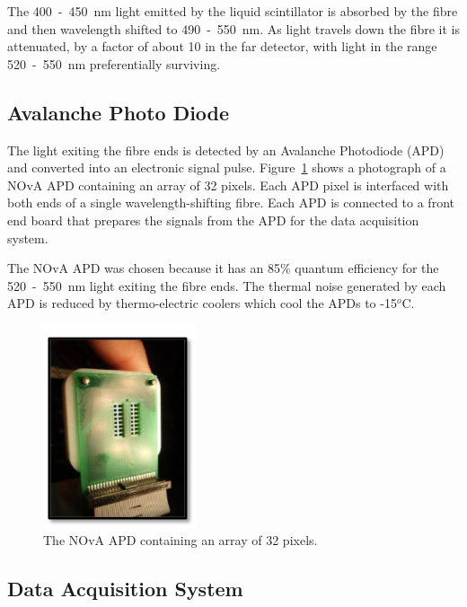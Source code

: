 The 400~-~450~nm light emitted by the liquid scintillator is absorbed
by the fibre and then wavelength shifted to 490~-~550~nm. 
As light travels down the fibre it is attenuated, by a factor of about
10 in the far detector, with light in the range 520~-~550~nm
preferentially surviving. 


\subsection{Avalanche Photo Diode}

The light exiting the fibre ends is detected by an Avalanche
Photodiode (APD) and converted into an
electronic signal pulse. 
Figure~\ref{fig:apd} shows a photograph of a NOvA APD
containing an array
of 32 pixels. Each APD pixel is interfaced with both ends of a single
wavelength-shifting fibre. Each APD is connected to a front end board
that prepares the signals from the APD for the data acquisition
system. 

The NOvA APD was chosen because it has an 85\% quantum efficiency for
the 520~-~550~nm light exiting the fibre ends. 
The thermal noise generated by each APD is reduced by thermo-electric
coolers which cool the APDs to -15$^o$C. 


\begin{figure}
  \centering
  \includegraphics[width=0.4\textwidth]{../../img/det/gen/APD.png}
  \caption{The NOvA APD containing an array of 32 pixels.}
  \label{fig:apd}
\end{figure}





\subsection{Data Acquisition System}

